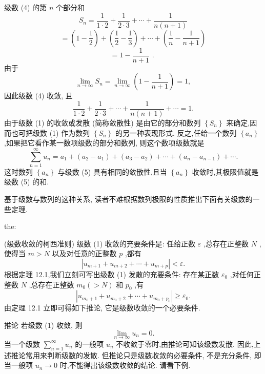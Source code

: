 \begin{solution}

\end{solution}
级数 (4) 的第 \(n\) 个部分和
\[
{S}_{n} = \frac{1}{1 \cdot  2} + \frac{1}{2 \cdot  3} + \cdots  + \frac{1}{n\left( {n + 1}\right) }
\]
\[
= \left( {1 - \frac{1}{2}}\right)  + \left( {\frac{1}{2} - \frac{1}{3}}\right)  + \cdots  + \left( {\frac{1}{n} - \frac{1}{n + 1}}\right)
\]
\[
= 1 - \frac{1}{n + 1}\text{ . }
\]
由于
\[
\mathop{\lim }\limits_{{n \rightarrow  \infty }}{S}_{n} = \mathop{\lim }\limits_{{n \rightarrow  \infty }}\left( {1 - \frac{1}{n + 1}}\right)  = 1,
\]
因此级数 (4) 收敛, 且
\[
\frac{1}{1 \cdot  2} + \frac{1}{2 \cdot  3} + \cdots  + \frac{1}{n\left( {n + 1}\right) } + \cdots  = 1.
\]
由于级数 (1) 的收敛或发散 (简称敛散性) 是由它的部分和数列 \(\left\{  {S}_{n}\right\}\) 来确定,因而也可把级数 (1) 作为数列 \(\left\{  {S}_{n}\right\}\) 的另一种表现形式. 反之,任给一个数列 \(\left\{  {a}_{n}\right\}\) ,如果把它看作某一数项级数的部分和数列, 则这个数项级数就是
\[
\mathop{\sum }\limits_{{n = 1}}^{\infty }{u}_{n} = {a}_{1} + \left( {{a}_{2} - {a}_{1}}\right)  + \left( {{a}_{3} - {a}_{2}}\right)  + \cdots  + \left( {{a}_{n} - {a}_{n - 1}}\right)  + \cdots . \tag{5}
\]
这时数列 \(\left\{  {a}_{n}\right\}\) 与级数 (5) 具有相同的敛散性,且当 \(\left\{  {a}_{n}\right\}\) 收敛时,其极限值就是级数 (5) 的和.

基于级数与数列的这种关系, 读者不难根据数列极限的性质推出下面有关级数的一些定理.

\begin{theorem}{}{the:}

\end{theorem}
 (级数收敛的柯西准则) 级数 (1) 收敛的充要条件是: 任给正数 \(\varepsilon\) ,总存在正整数 \(N\) ,使得当 \(m > N\) 以及对任意的正整数 \(p\) ,都有
\[
\left| {{u}_{m + 1} + {u}_{m + 2} + \cdots  + {u}_{m + p}}\right|  < \varepsilon . \tag{6}
\]
根据定理 12.1,我们立刻可写出级数 (1) 发散的充要条件: 存在某正数 \({\varepsilon }_{0}\) ,对任何正整数 \(N\) ,总存在正整数 \({m}_{0}\left( { > N}\right)\) 和 \({p}_{0}\) ,有
\[
\left| {{u}_{{m}_{0} + 1} + {u}_{{m}_{0} + 2} + \cdots  + {u}_{{m}_{0} + {p}_{0}}}\right|  \geq  {\varepsilon }_{0}. \tag{7}
\]
由定理 12.1 立即可得如下推论, 它是级数收敛的一个必要条件.

推论 若级数 (1) 收敛, 则
\[
\mathop{\lim }\limits_{{n \rightarrow  \infty }}{u}_{n} = 0.
\]
当一个级数 \(\mathop{\sum }\limits_{{n = 1}}^{\infty }{u}_{n}\) 的一般项 \({u}_{n}\) 不收敛于零时,由推论可知该级数发散. 因此,上述推论常用来判断级数的发散. 但推论只是级数收敛的必要条件, 不是充分条件, 即当一般项 \({u}_{n} \rightarrow  0\) 时,不能得出该级数收敛的结论. 请看下例.

